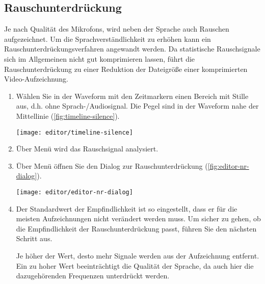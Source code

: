 \subsection{Rauschunterdrückung}
Je nach Qualität des Mikrofons, wird neben der Sprache auch Rauschen aufgezeichnet. Um die Sprachverständlichkeit zu erhöhen kann ein Rauschunterdrückungsverfahren angewandt werden. Da statistische Rauschsignale sich im Allgemeinen nicht gut komprimieren lassen, führt die Rauschunterdrückung zu einer Reduktion der Dateigröße einer komprimierten Video-Aufzeichnung.

\begin{enumerate}
	\item Wählen Sie in der Waveform mit den Zeitmarkern einen Bereich mit Stille aus, d.h. ohne Sprach-/Audiosignal. Die Pegel sind in der Waveform nahe der Mittellinie (\autoref{fig:timeline-silence}).
	
	\begin{minipage}{0.9\textwidth}
		\centering
		\captionsetup{type=figure}
		\texttt{[image: editor/timeline-silence]}
		\label{fig:timeline-silence}
	\end{minipage}

	\item Über Menü  wird das Rauschsignal analysiert.
	\item Über Menü  öffnen Sie den Dialog zur Rauschunterdrückung (\autoref{fig:editor-nr-dialog}).

	\begin{minipage}{0.9\textwidth}
		\centering
		\captionsetup{type=figure}
		\texttt{[image: editor/editor-nr-dialog]}
		\label{fig:editor-nr-dialog}
	\end{minipage}

	\item Der Standardwert der Empfindlichkeit ist so eingestellt, dass er für die meisten Aufzeichnungen nicht verändert werden muss. Um sicher zu gehen, ob die Empfindlichkeit der Rauschunterdrückung passt, führen Sie den nächsten Schritt aus.
	
	\begin{info}
		Je höher der Wert, desto mehr Signale werden aus der Aufzeichnung entfernt. Ein zu hoher Wert beeinträchtigt die Qualität der Sprache, da auch hier die dazugehörenden Frequenzen unterdrückt werden.
	\end{info}


\end{enumerate}

